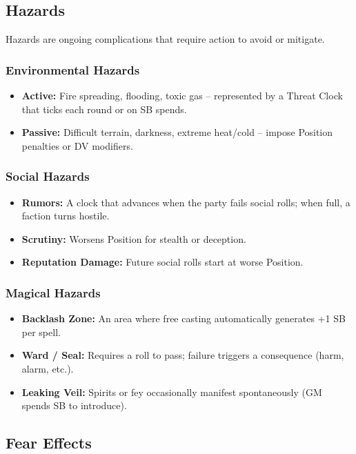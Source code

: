 \subsection{Hazards}

Hazards are ongoing complications that require action to avoid or mitigate.

\subsubsection{Environmental Hazards}
\begin{itemize}
  \item \textbf{Active:} Fire spreading, flooding, toxic gas – represented by a Threat Clock that ticks each round or on SB spends.
  \item \textbf{Passive:} Difficult terrain, darkness, extreme heat/cold – impose Position penalties or DV modifiers.
\end{itemize}

\subsubsection{Social Hazards}
\begin{itemize}
  \item \textbf{Rumors:} A clock that advances when the party fails social rolls; when full, a faction turns hostile.
  \item \textbf{Scrutiny:} Worsens Position for stealth or deception.
  \item \textbf{Reputation Damage:} Future social rolls start at worse Position.
\end{itemize}

\subsubsection{Magical Hazards}
\begin{itemize}
  \item \textbf{Backlash Zone:} An area where free casting automatically generates +1 SB per spell.
  \item \textbf{Ward / Seal:} Requires a roll to pass; failure triggers a consequence (harm, alarm, etc.).
  \item \textbf{Leaking Veil:} Spirits or fey occasionally manifest spontaneously (GM spends SB to introduce).
\end{itemize}

\subsection{Fear Effects}

